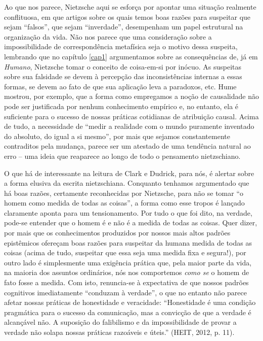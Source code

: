\documentclass[
	12pt,				%
	openright,			%
	oneside,			%
	a4paper,			%
	english,			%
	french,				%
	spanish,			%
	brazil				%
	]{abntex2}
\begin{document}
	Ao que nos parece, Nietzsche aqui se esforça por apontar uma situação realmente conflituosa, em que artigos sobre os quais temos boas razões para suspeitar que sejam “falsos”, que sejam “inverdade”, desempenham um papel estrutural na organização da vida. Não nos parece que uma consideração sobre a impossibilidade de correspondência metafísica seja o motivo dessa suspeita, lembrando que no capítulo \ref{cap1} argumentamos sobre as consequências de, já em \textit{Humano}, Nietzsche tomar o conceito de coisa-em-si por inócuo. As suspeitas sobre sua falsidade se devem à percepção das inconsistências internas a essas formas, se devem ao fato de que sua aplicação leva a paradoxos, etc. Hume mostrou, por exemplo, que a forma como empregamos a noção de causalidade não pode ser justificada por nenhum conhecimento empírico e, no entanto, ela é suficiente para o sucesso de nossas práticas cotidianas de atribuição causal. Acima de tudo, a necessidade de “medir a realidade com o mundo puramente inventado do absoluto, do igual a si mesmo”, por mais que sejamos constantemente contraditos pela mudança, parece ser um atestado de uma tendência natural ao erro – uma ideia que reaparece ao longo de todo o pensamento nietzschiano.
	
	O que há de interessante na leitura de Clark e Dudrick, para nós, é alertar sobre a forma elusiva da escrita nietzschiana. Conquanto tenhamos argumentado que há boas razões, certamente reconhecidas por Nietzsche, para não se tomar “o homem como medida de todas as coisas”, a forma como esse tropos é lançado claramente aponta para um tensionamento. Por tudo o que foi dito, na verdade, pode-se entender que o homem é e não é a medida de todas as coisas. Quer dizer, por mais que os conhecimentos produzidos por nossos mais altos padrões epistêmicos ofereçam boas razões para suspeitar da humana medida de todas as coisas (acima de tudo, suspeitar que essa seja uma medida fixa e segura!), por outro lado é simplesmente uma exigência prática que, pela maior parte da vida, na maioria dos assuntos ordinários, nós nos comportemos \textit{como se} o homem de fato fosse a medida. Com isto, renuncia-se à expectativa de que nossos padrões cognitivos imediatamente “conduzam à verdade”, o que no entanto não parece afetar nossas práticas de honestidade e veracidade: “Honestidade é uma condição pragmática para o sucesso da comunicação, mas a convicção de que a verdade é alcançável não. A suposição do falibilismo e da impossibilidade de provar a verdade não solapa nossas práticas razoáveis e úteis.” (HEIT, 2012, p. 11).
\end{document}
